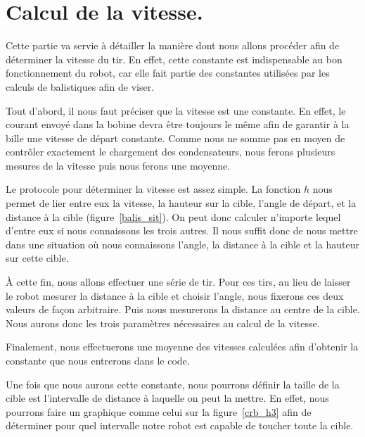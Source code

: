 \section{Calcul de la vitesse.}
Cette partie va servie à détailler la manière dont nous allons procéder afin de déterminer la vitesse du tir. En effet, cette constante est indispensable au bon fonctionnement du robot, car elle fait partie des constantes utilisées par les calculs de balistiques afin de viser.

Tout d'abord, il nous faut préciser que la vitesse est une constante. En effet, le courant envoyé dans la bobine devra être toujours le même afin de garantir à la bille une vitesse de départ constante. Comme nous ne somme pas en moyen de contrôler exactement le chargement des condensateurs, nous ferons plusieurs mesures de la vitesse puis nous ferons une moyenne.

Le protocole pour déterminer la vitesse est assez simple. La fonction $h$ nous permet de lier entre eux la vitesse, la hauteur sur la cible, l'angle de départ, et la distance à la cible (figure~\ref{balis_sit}). On peut donc calculer n'importe lequel d'entre eux si nous connaissons les trois autres. Il nous suffit donc de nous mettre dans une situation où nous connaissons l'angle, la distance à la cible et la hauteur sur cette cible.

À cette fin, nous allons effectuer une série de tir. Pour ces tirs, au lieu de laisser le robot mesurer la distance à la cible et choisir l'angle, nous fixerons ces deux valeurs de façon arbitraire. Puis nous mesurerons la distance au centre de la cible. Nous aurons donc les trois paramètres nécessaires au calcul de la vitesse.

Finalement, nous effectuerons une moyenne des vitesses calculées afin d'obtenir la constante que nous entrerons dans le code.

Une fois que nous aurons cette constante, nous pourrons définir la taille de la cible est l'intervalle de distance à laquelle on peut la mettre. En effet, nous pourrons faire un graphique comme celui sur la figure~\ref{crb_h3} afin de déterminer pour quel intervalle notre robot est capable de toucher toute la cible.

